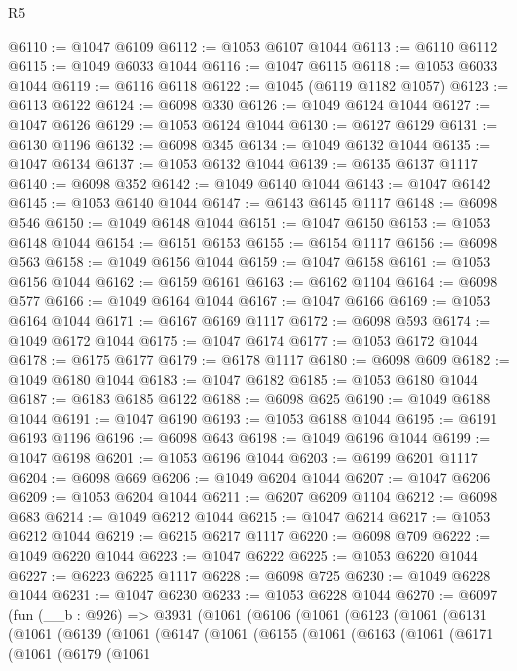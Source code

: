 \begin{lexlean}{R5}
\begin{coremodule}
@6110 := @1047 @6109
@6112 := @1053 @6107 @1044
@6113 := @6110 @6112
@6115 := @1049 @6033 @1044
@6116 := @1047 @6115
@6118 := @1053 @6033 @1044
@6119 := @6116 @6118
@6122 := @1045 (@6119 @1182 @1057)
@6123 := @6113 @6122
@6124 := @6098 @330
@6126 := @1049 @6124 @1044
@6127 := @1047 @6126
@6129 := @1053 @6124 @1044
@6130 := @6127 @6129
@6131 := @6130 @1196
@6132 := @6098 @345
@6134 := @1049 @6132 @1044
@6135 := @1047 @6134
@6137 := @1053 @6132 @1044
@6139 := @6135 @6137 @1117
@6140 := @6098 @352
@6142 := @1049 @6140 @1044
@6143 := @1047 @6142
@6145 := @1053 @6140 @1044
@6147 := @6143 @6145 @1117
@6148 := @6098 @546
@6150 := @1049 @6148 @1044
@6151 := @1047 @6150
@6153 := @1053 @6148 @1044
@6154 := @6151 @6153
@6155 := @6154 @1117
@6156 := @6098 @563
@6158 := @1049 @6156 @1044
@6159 := @1047 @6158
@6161 := @1053 @6156 @1044
@6162 := @6159 @6161
@6163 := @6162 @1104
@6164 := @6098 @577
@6166 := @1049 @6164 @1044
@6167 := @1047 @6166
@6169 := @1053 @6164 @1044
@6171 := @6167 @6169 @1117
@6172 := @6098 @593
@6174 := @1049 @6172 @1044
@6175 := @1047 @6174
@6177 := @1053 @6172 @1044
@6178 := @6175 @6177
@6179 := @6178 @1117
@6180 := @6098 @609
@6182 := @1049 @6180 @1044
@6183 := @1047 @6182
@6185 := @1053 @6180 @1044
@6187 := @6183 @6185 @6122
@6188 := @6098 @625
@6190 := @1049 @6188 @1044
@6191 := @1047 @6190
@6193 := @1053 @6188 @1044
@6195 := @6191 @6193 @1196
@6196 := @6098 @643
@6198 := @1049 @6196 @1044
@6199 := @1047 @6198
@6201 := @1053 @6196 @1044
@6203 := @6199 @6201 @1117
@6204 := @6098 @669
@6206 := @1049 @6204 @1044
@6207 := @1047 @6206
@6209 := @1053 @6204 @1044
@6211 := @6207 @6209 @1104
@6212 := @6098 @683
@6214 := @1049 @6212 @1044
@6215 := @1047 @6214
@6217 := @1053 @6212 @1044
@6219 := @6215 @6217 @1117
@6220 := @6098 @709
@6222 := @1049 @6220 @1044
@6223 := @1047 @6222
@6225 := @1053 @6220 @1044
@6227 := @6223 @6225 @1117
@6228 := @6098 @725
@6230 := @1049 @6228 @1044
@6231 := @1047 @6230
@6233 := @1053 @6228 @1044
@6270 := @6097
    (fun (__b : @926) =>
    @3931
      (@1061
        (@6106
          (@1061
            (@6123
              (@1061
                (@6131
                  (@1061
                    (@6139
                      (@1061
                        (@6147
                          (@1061
                            (@6155
                              (@1061
                                (@6163
                                  (@1061
                                    (@6171
                                      (@1061
                                        (@6179
                                          (@1061

\end{coremodule}
\end{lexlean}
